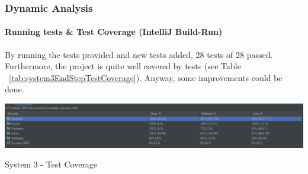 \documentclass[]{article}
\begin{document}
\subsubsection{Dynamic Analysis}

\paragraph{Running tests \& Test Coverage (IntelliJ Build-Run)} By running the tests provided and new tests added, 28 tests of 28 passed. Furthermore, the project is quite well covered by tests (see Table ~\ref{tab:system3EndStepTestCoverage}). Anyway, some improvements could be done.

\begin{table}
\centering
    \includegraphics[width=\linewidth]{imgs/system3lastStepTestCover.PNG}
    \caption{System 3 - Test Coverage}
    \label{tab:system3EndStepTestCoverage}
\end{table}



 
\end{document}

